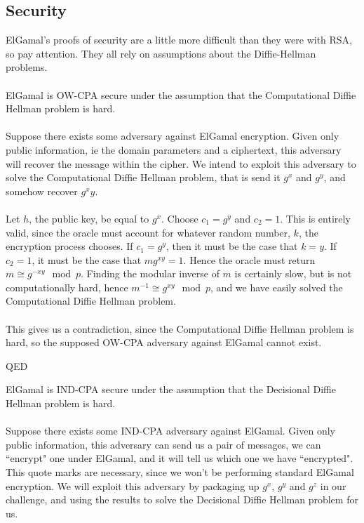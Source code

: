 	\subsection{Security}
	ElGamal's proofs of security are a little more difficult than they were with RSA, so pay attention. They all rely on assumptions about the Diffie-Hellman problems.\\
\\
	ElGamal is OW-CPA secure under the assumption that the Computational Diffie Hellman problem is hard.\\
\\
	Suppose there exists some adversary against ElGamal encryption. Given only public information, ie the domain parameters and a ciphertext, this adversary will recover the message within the cipher. We intend to exploit this adversary to solve the Computational Diffie Hellman problem, that is send it $g^x$ and $g^y$, and somehow recover $g^xy$.\\
\\
	Let $h$, the public key, be equal to $g^x$. Choose $c_1 = g^y$ and $c_2 = 1$. This is entirely valid, since the oracle must account for whatever random number, $k$, the encryption process chooses. If $c_1 = g^y$, then it must be the case that $k=y$. If $c_2=1$, it must be the case that $mg^{xy} = 1$. Hence the oracle must return $m \cong g^{-xy} \mod p$. Finding the modular inverse of $m$ is certainly slow, but is not computationally hard, hence $m^{-1} \cong g^{xy} \mod p$, and we have easily solved the Computational Diffie Hellman problem.\\
\\
	This gives us a contradiction, since the Computational Diffie Hellman problem is hard, so the supposed OW-CPA adversary against ElGamal cannot exist.
\begin{flushright}
QED\\
\end{flushright}
	ElGamal is IND-CPA secure under the assumption that the Decisional Diffie Hellman problem is hard.\\
\\
	Suppose there exists some IND-CPA adversary against ElGamal. Given only public information, this adversary can send us a pair of messages, we can ``encrypt" one under ElGamal, and it will tell us which one we have ``encrypted". This quote marks are necessary, since we won't be performing standard ElGamal encryption. We will exploit this adversary by packaging up $g^x$, $g^y$ and $g^z$ in our challenge, and using the results to solve the Decisional Diffie Hellman problem for us.\\

